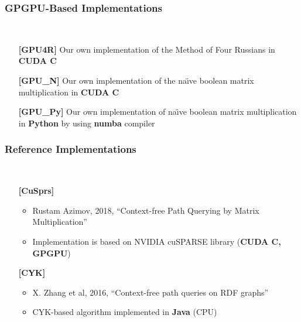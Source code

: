 \documentclass[xcolor=table]{beamer}
\begin{document}
\begin{frame}[fragile] \frametitle{GPGPU-Based Implementations}
  \begin{minipage}[t]{1cm}
\hspace{1cm}
  \end{minipage}
  ~
\begin{minipage}[t]{0.85\textwidth}
\begin{itemize}
\item[\textbf{[GPU4R]}] Our own implementation of the Method of Four
Russians in \textbf{CUDA C}
\pause
\item[\textbf{[GPU\_N]}] Our own implementation of the na\"{\i}ve boolean
matrix multiplication in \textbf{CUDA C}
\pause
\item[\textbf{[GPU\_Py]}] Our own implementation of na\"{\i}ve boolean matrix
multiplication in \textbf{Python} by using \textbf{numba} compiler
\end{itemize}
\end{minipage}
\end{frame}

\begin{frame}[fragile] \frametitle{Reference Implementations}
  \begin{minipage}[t]{1cm}
\hspace{1cm}
  \end{minipage}
  ~
\begin{minipage}[t]{0.85\textwidth}
\begin{itemize}
\item[\textbf{[CuSprs]}]
\begin{itemize}
  \item Rustam Azimov, 2018, ``Context-free Path Querying by Matrix Multiplication''
  \item Implementation is based on NVIDIA cuSPARSE library (\textbf{CUDA C, GPGPU})
\end{itemize}
\pause
\item[\textbf{[CYK]}]
\begin{itemize}
  \item X. Zhang et al, 2016, ``Context-free path queries on RDF graphs''
  \item CYK-based algorithm implemented in \textbf{Java} (CPU)
\end{itemize}
\end{itemize}
\end{minipage}
\end{frame}
\end{document}
